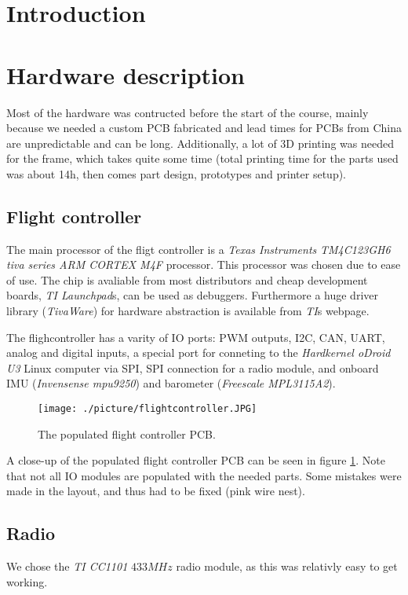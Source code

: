 


\newpage

\section{ Introduction }



\section{Hardware description}
Most of the hardware was contructed before the start of the course, mainly
because we needed a custom PCB fabricated and lead times for PCBs from China are
unpredictable and can be long.
Additionally, a lot of 3D printing was needed for the frame, which takes quite
some time (total printing time for the parts used was about 14h, then comes
part design, prototypes and printer setup).

\subsection{ Flight controller }
The main processor of the fligt controller is a \emph{Texas
Instruments} \emph{TM4C123GH6 tiva series ARM CORTEX M4F} processor.
This processor was chosen due to ease of use.
The chip is avaliable from most distributors and cheap development boards,
\emph{TI Launchpad}s, can be used as debuggers. Furthermore a huge driver
library (\emph{TivaWare}) for hardware abstraction is available from \emph{TI}s
webpage.

The flighcontroller has a varity of IO ports: PWM outputs, I2C, CAN, UART,
analog and digital inputs, a special port for conneting to the \emph{Hardkernel
oDroid U3} Linux computer via SPI, SPI connection for a radio module, and
onboard IMU (\emph{Invensense mpu9250}) and barometer (\emph{Freescale
MPL3115A2}).
\begin{figure}
	\centering
	\texttt{[image: ./picture/flightcontroller.JPG]}
	\caption{The populated flight controller PCB.}
	\label{fig:flightcontroller}
\end{figure}

A close-up of the populated flight controller PCB can be seen in figure
\ref{fig:flightcontroller}. Note that not all IO modules are populated with the
needed parts. Some mistakes were made in the layout, and thus had to be fixed
(pink wire nest).

\subsection{ Radio }
We chose the \emph{TI CC1101} $433MHz$ radio module, as this was relativly easy
to get working.

